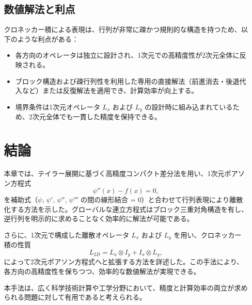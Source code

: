 \documentclass[11pt]{article}
\begin{document}
\subsection{数値解法と利点}
クロネッカー積による表現は、行列が非常に疎かつ規則的な構造を持つため、以下のような利点がある：
\begin{itemize}
  \item 各方向のオペレータは独立に設計され、1次元での高精度性が2次元全体に反映される。
  \item ブロック構造および疎行列性を利用した専用の直接解法（前進消去・後退代入など）または反復解法を適用でき、計算効率が向上する。
  \item 境界条件は1次元オペレータ $L_x$ および $L_y$ の設計時に組み込まれているため、2次元全体でも一貫した精度を保持できる。
\end{itemize}

\section{結論}
本章では、テイラー展開に基づく高精度コンパクト差分法を用い、1次元ポアソン方程式
\[
\psi''(x) - f(x) = 0,
\]
を補助式（$\psi,\,\psi',\,\psi'',\,\psi'''$ の間の線形結合 = 0）と合わせて行列表現により離散化する方法を示した。グローバルな連立方程式はブロック三重対角構造を有し、逆行列を明示的に求めることなく効率的に解法が可能である。\newline

さらに、1次元で構成した離散オペレータ $L_x$ および $L_y$ を用い、クロネッカー積の性質
\[
L_{2D} = L_x \otimes I_y + I_x \otimes L_y,
\]
によって2次元ポアソン方程式へと拡張する方法を詳述した。この手法により、各方向の高精度性を保ちつつ、効率的な数値解法が実現できる。\newline

本手法は、広く科学技術計算や工学分野において、精度と計算効率の両立が求められる問題に対して有用であると考えられる。
\end{document}
